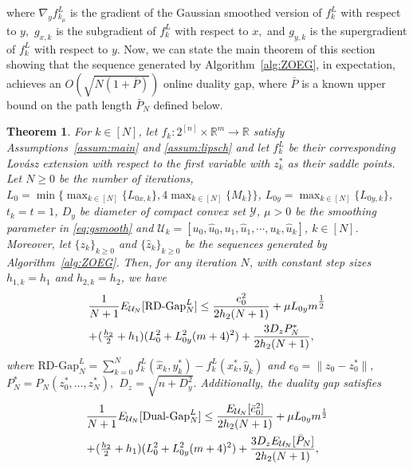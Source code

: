 \documentclass{article}
\theoremstyle{plain}
\newtheorem{theorem}{Theorem}[section]
\theoremstyle{definition}
\theoremstyle{remark}
\newcommand{\R}{\mathbb{R}}
\begin{document}
where $\nabla_y f_{k_\mu}^L$ is the gradient of the Gaussian smoothed version of $f_k^L$  with respect to $y,$ $g_{x,k}$ is the subgradient of $f_k^L$ with respect to $x,$ and $g_{y,k}$ is the supergradient of $f_k^L$ with respect to $y.$ 
Now, we can state the main theorem of this section showing that the sequence generated by Algorithm~\ref{alg:ZOEG}, in expectation, achieves an $O(\sqrt{N(1+\bar{P})})$ online duality gap, where $\bar{P}$ is a known upper bound on the path length $\bar{P}_N$ defined below.
\begin{theorem}\label{th:on}
For $k\in [N]$, %
let $f_k:2^{[n]}\times\R^m\to\mathbb{R}$ satisfy Assumptions~\ref{assum:main} and \ref{assum:lipsch} and let $f^L_k$ be their corresponding Lovász extension with respect to the first variable with $z^\ast_k$ as their saddle points.
Let $N\geq0$ be the number of iterations, $ L_0 = \min\{\max_{k\in[N]}\{L_{0x,k}\},4\max_{k\in[N]}\{M_k\}\}$, $L_{0y}=\max_{k\in[N]}\{L_{0y,k}\}$, $t_k=t=1$, %
$D_y$ be diameter of compact convex set $\mathcal{Y}$, $\mu>0$ be the  smoothing parameter in \eqref{eq:gsmooth} and $\mathcal{U}_k = [u_0,\hat{u}_0,u_1,\hat{u}_1,\cdots,u_k,\hat{u}_k]$, 
     $k\in [N]$.
     Moreover, let $\{z_k\}_{k\geq0}$ and $\{\hat{z}_k\}_{k\geq0}$ be the sequences generated by Algorithm~\ref{alg:ZOEG}.  
     Then, for any iteration $N$, with constant step sizes \(h_{1,k}= h_1 \) and \(h_{2,k}= h_2 \),
     we have
     \begin{align}
	&\frac{1}{N+1} E_{\mathcal{U}_{N}}[\text{RD-Gap}^L_N]\leq \frac{e_0^2}{2h_2(N+1)}+\mu L_{0y}m^{\tfrac{1}{2}}\notag\\
    &\!+\!(\tfrac{h_2}{2}+h_1)( L_0^2+L_{0y}^2(m+4)^2)+\frac{3D_zP_N^\ast}{2h_2(N+1)},
     \label{eq:eqon}
\end{align}
    where 
    $\text{RD-Gap}^L_N =\sum_{k=0}^N f^L_k(\hat{x}_k,y^\ast_k) - f^L_k(x^\ast_k,\hat{y}_k)$ and $e_0=\|z_0-z_0^\ast\|,$ $ P_N^\ast=P_N(z^\ast_0,\dots,z^\ast_N),$ $D_z=\sqrt{n+D_y^2}.$
    Additionally, the duality gap satisfies
    \begin{align}
	&\frac{1}{N+1}E_{\mathcal{U}_{N}}[\text{Dual-Gap}_N^L]\leq \frac{E_{\mathcal{U}_N}[\bar{e}_0^2]}{2h_2(N+1)}+\mu L_{0y}m^{\frac{1}{2}}\notag\\
    & \!+\! (\tfrac{h_2}{2}+h_1)( L_0^2+L_{0y}^2(m+4)^2)+\frac{3D_zE_{\mathcal{U}_N}[\bar{P}_N]}{2h_2(N+1)},

\end{align}
\end{theorem}
\end{document}
